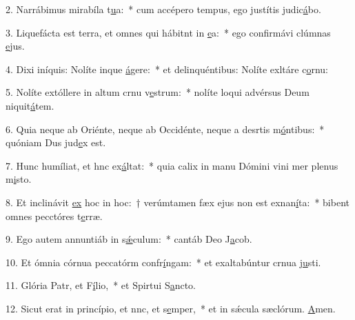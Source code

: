 2. Narrábimus mirabíla t\uline{u}a:~* cum accépero tempus, ego justítis judic\uline{á}bo.\par 
3. Liquefácta est terra, et omnes qui hábitnt in \uline{e}a:~* ego confirmávi clúmnas \uline{e}jus.\par 
4. Dixi iníquis: Nolíte inque \uline{á}gere:~* et delinquéntibus: Nolíte exltáre c\uline{o}rnu:\par 
5. Nolíte extóllere in altum crnu v\uline{e}strum:~* nolíte loqui advérsus Deum niquit\uline{á}tem.\par 
6. Quia neque ab Oriénte, neque ab Occidénte, neque a desrtis m\uline{ó}ntibus:~* quóniam Dus jud\uline{e}x est.\par 
7. Hunc humíliat, et hnc ex\uline{á}ltat:~* quia calix in manu Dómini vini mer plenus m\uline{i}sto.\par 
8. Et inclinávit \uline{ex} hoc in hoc:~† verúmtamen fæx ejus non est exnan\uline{í}ta:~* bibent omnes pecctóres t\uline{e}rræ.\par 
9. Ego autem annuntiáb in s\uline{ǽ}culum:~* cantáb Deo J\uline{a}cob.\par 
10. Et ómnia córnua peccatórm confr\uline{í}ngam:~* et exaltabúntur crnua j\uline{u}sti.\par 
11. Glória Patr, et F\uline{í}lio,~* et Spirtui S\uline{a}ncto.\par 
12. Sicut erat in princípio, et nnc, et s\uline{e}mper,~* et in sǽcula sæclórum. \uline{A}men.\par 
